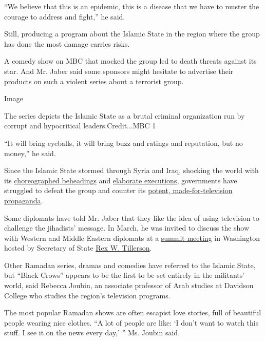 ``We believe that this is an epidemic, this is a disease that we have to
muster the courage to address and fight,'' he said.

Still, producing a program about the Islamic State in the region where
the group has done the most damage carries risks.

A comedy show on MBC that mocked the group led to death threats against
its star. And Mr. Jaber said some sponsors might hesitate to advertise
their products on such a violent series about a terrorist group.

Image

The series depicts the Islamic State as a brutal criminal organization
run by corrupt and hypocritical leaders.Credit...MBC 1

``It will bring eyeballs, it will bring buzz and ratings and reputation,
but no money,'' he said.

Since the Islamic State stormed through Syria and Iraq, shocking the
world with its
\href{https://www.nytimes.com/2014/08/20/world/middleeast/isis-james-foley-syria-execution.html}{choreographed
beheadings} and
\href{https://www.nytimes.com/2015/02/04/world/middleeast/isis-said-to-burn-captive-jordanian-pilot-to-death-in-new-video.html}{elaborate
executions}, governments have struggled to defeat the group and counter
its
\href{https://www.nytimes.com/2014/08/31/world/middleeast/isis-displaying-a-deft-command-of-varied-media.html?_r=0}{potent,
made-for-television propaganda}.

Some diplomats have told Mr. Jaber that they like the idea of using
television to challenge the jihadists' message. In March, he was invited
to discuss the show with Western and Middle Eastern diplomats at a
\href{https://www.nytimes.com/2017/03/22/world/middleeast/rex-tillerson-isis.html}{summit
meeting} in Washington hosted by Secretary of State
\href{http://topics.nytimes.com/top/reference/timestopics/people/t/rex_w_tillerson/index.html?inline=nyt-per}{Rex
W. Tillerson}.

Other Ramadan series, dramas and comedies have referred to the Islamic
State, but ``Black Crows'' appears to be the first to be set entirely in
the militants' world, said Rebecca Joubin, an associate professor of
Arab studies at Davidson College who studies the region's television
programs.

The most popular Ramadan shows are often escapist love stories, full of
beautiful people wearing nice clothes. ``A lot of people are like: `I
don't want to watch this stuff. I see it on the news every day,' '' Ms.
Joubin said.

